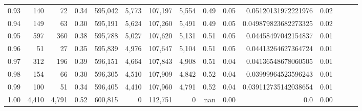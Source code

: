 \begin{tabular}{rrrrrrrrrrrrrrr}
0.93 &     140 &      72 &  0.34 &  595,042 &    5,773 &  107,197 &    5,554 &  0.49 &  0.05 &   0.05120131972221976 &      0.02 \\
0.94 &     149 &      63 &  0.30 &  595,191 &    5,624 &  107,260 &    5,491 &  0.49 &  0.05 &  0.049879823682273325 &      0.02 \\
0.95 &     597 &     360 &  0.38 &  595,788 &    5,027 &  107,620 &    5,131 &  0.51 &  0.05 &   0.04458497042154837 &      0.01 \\
0.96 &      51 &      27 &  0.35 &  595,839 &    4,976 &  107,647 &    5,104 &  0.51 &  0.05 &   0.04413264627364724 &      0.01 \\
0.97 &     312 &     196 &  0.39 &  596,151 &    4,664 &  107,843 &    4,908 &  0.51 &  0.04 &   0.04136548678060505 &      0.01 \\
0.98 &     154 &      66 &  0.30 &  596,305 &    4,510 &  107,909 &    4,842 &  0.52 &  0.04 &   0.03999964523596243 &      0.01 \\
0.99 &     100 &      51 &  0.34 &  596,405 &    4,410 &  107,960 &    4,791 &  0.52 &  0.04 &  0.039112735142038654 &      0.01 \\
1.00 &   4,410 &   4,791 &  0.52 &  600,815 &        0 &  112,751 &        0 &   nan &  0.00 &                   0.0 &      0.00 \\
\bottomrule
\end{tabular}
